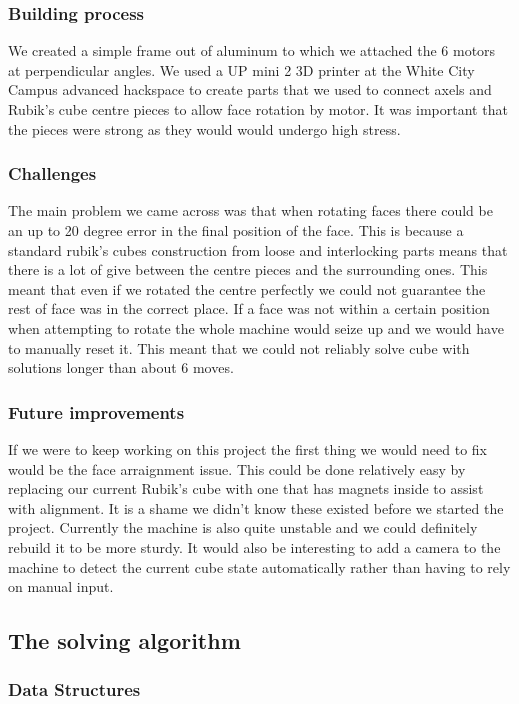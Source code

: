 \documentclass[8pt]{article}
\begin{document}
\subsubsection{Building process}

We created a simple frame out of aluminum to which we attached the 6 motors at perpendicular angles.
We used a UP mini 2 3D printer at the White City Campus advanced hackspace to create parts
that we used to connect axels and Rubik's cube centre pieces to allow face rotation by motor.
It was important that the pieces were strong as they would would undergo high stress.
\subsubsection{Challenges}

The main problem we came across was that when rotating faces there could be an up
to 20 degree error in the final position of the face. This is because a standard rubik's cubes
construction from loose and interlocking parts means that there is a lot of give 
between the centre pieces and the surrounding ones. This meant that even if we rotated 
the centre perfectly we could not guarantee the rest of face was in the correct place.
If a face was not within a certain position when attempting to rotate the whole 
machine would seize up and we would have to manually reset it. This meant that we could not
reliably solve cube with solutions longer than about 6 moves. 


\subsubsection{Future improvements}

If we were to keep working on this project the first thing we would need to fix 
would be the face arraignment issue. This could be done relatively easy by replacing
our current Rubik's cube with one that has magnets inside to assist with alignment.
It is a shame we didn't know these existed before we started the project. Currently 
the machine is also quite unstable and we could definitely rebuild it to be more sturdy. 
It would also be interesting to add a camera to the machine to detect the current cube state
automatically rather than having to rely on manual input. 

\subsection{The solving algorithm}
\subsubsection{Data Structures}
\end{document}
